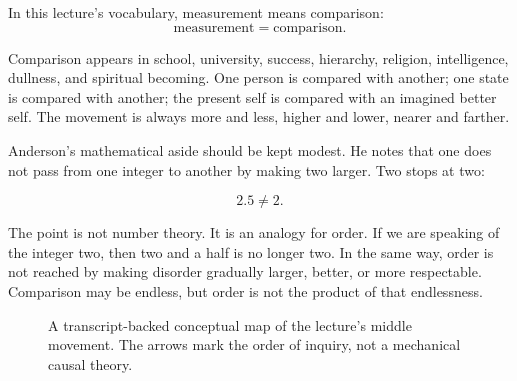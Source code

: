 \begin{definition}
In this lecture's vocabulary, measurement means comparison:
\begin{equation}
\text{measurement}=\text{comparison}.
\end{equation}
\end{definition}

Comparison appears in school, university, success, hierarchy, religion, intelligence, dullness, and spiritual becoming. One person is compared with another; one state is compared with another; the present self is compared with an imagined better self. The movement is always more and less, higher and lower, nearer and farther.

Anderson's mathematical aside should be kept modest. He notes that one does not pass from one integer to another by making two larger. Two stops at two:

\begin{equation}
2.5\neq 2.
\end{equation}

The point is not number theory. It is an analogy for order. If we are speaking of the integer two, then two and a half is no longer two. In the same way, order is not reached by making disorder gradually larger, better, or more respectable. Comparison may be endless, but order is not the product of that endlessness.

\begin{figure}
\centering
{}

A transcript-backed conceptual map of the lecture's middle movement. The arrows mark the order of inquiry, not a mechanical causal theory.
\end{figure}

